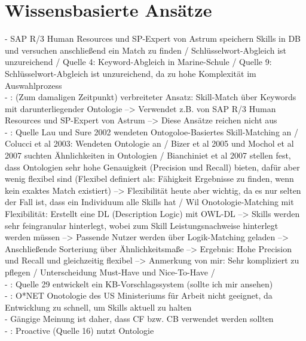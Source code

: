 \section{Wissensbasierte Ansätze}
\label{ch:standDerForschung:wissensbasierteAnsaetze}
- \cite{malinowski:2008} SAP R/3 Human Resources und SP-Expert von Astrum speichern Skills in DB und versuchen anschließend ein Match zu finden / Schlüsselwort-Abgleich ist unzureichend / Quelle 4: Keyword-Abgleich in Marine-Schule / Quelle 9: Schlüsselwort-Abgleich ist unzureichend, da zu hohe Komplexität im Auswahlprozess\\
- \cite{malinowski:2006}: (Zum damaligen Zeitpunkt) verbreiteter Ansatz: Skill-Match über Keywords mit darunterliegender Ontologie --> Verwendet z.B. von SAP R/3 Human Resources und SP-Expert von Astrum --> Diese Ansätze reichen nicht aus \\
- \cite{semanticMatchmaking:2009}: Quelle Lau und Sure 2002 wendeten Ontogoloe-Basiertes Skill-Matching an / Colucci et al 2003: Wendeten Ontologie an / Bizer et al 2005 und Mochol et al 2007 suchten Ähnlichkeiten in Ontologien / Bianchiniet et al 2007 stellen fest, dass Ontologien sehr hohe Genauigkeit (Precision und Recall) bieten, dafür aber wenig flexibel sind (Flexibel definiert als: Fähigkeit Ergebnisse zu finden, wenn kein exaktes Match existiert) --> Flexibilität heute aber wichtig, da es nur selten der Fall ist, dass ein Individuum alle Skills hat / Wil Onotologie-Matching mit Flexibilität: Erstellt eine DL (Description Logic) mit OWL-DL --> Skills werden sehr feingranular hinterlegt, wobei zum Skill Leistungsnachweise hinterlegt werden müssen --> Passende Nutzer werden über Logik-Matching geladen --> Anschließende Sorteriung über Ähnlichkeitsmaße --> Ergebnis: Hohe Precision und Recall und gleichzeitig flexibel --> Anmerkung von mir: Sehr kompliziert zu pflegen / Unterscheidung Must-Have und Nice-To-Have /  \\
- \cite{exploringJobRecommentations:2019}: Quelle 29 entwickelt ein KB-Vorschlagssystem (sollte ich mir ansehen)\\
- \cite{aCombinedRepresentation:2018}: O*NET Onotologie des US Ministeriums für Arbeit nicht geeignet, da Entwicklung zu schnell, um Skills aktuell zu halten\\
- Gängige Meinung ist daher, dass CF bzw. CB verwendet werden sollten \\
- \cite{jobRecommenderSystemsASurvey:2012}: Proactive (Quelle 16) nutzt Ontologie

